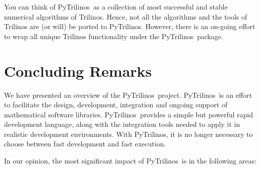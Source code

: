 \documentclass[10pt,relax]{SANDreport}
\newcommand{\PyTrilinos}{{PyTrilinos}}
\begin{document}
You can think of \PyTrilinos\ as a collection of most successful and
stable numerical algorithms of Trilinos.  Hence, not all the
algorithms and the tools of Trilinos are (or will) be ported to
\PyTrilinos.  However, there is an on-going effort to wrap all unique
Trilinos functionality under the \PyTrilinos\ package.

%
\section{Concluding Remarks}
\label{sec:concluding}

We have presented an overview of the
\PyTrilinos\ project. \PyTrilinos\ is an effort to facilitate the
design, development, integration and ongoing support of mathematical
software libraries.  \PyTrilinos\ provides a simple but powerful rapid
development language, along with the integration tools needed to apply
it in realistic development environments. With \PyTrilinos, it is no
longer necessary to choose between fast development and fast
execution.

In our opinion, the most significant impact of \PyTrilinos\ is in the
following areas:
\end{document}
